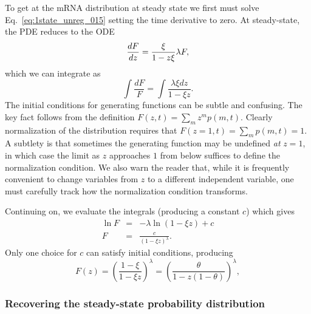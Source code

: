 To get at the mRNA distribution at steady state we first must solve
Eq.~\ref{eq:1state_unreg_015} setting the time derivative to zero. At
steady-state, the PDE reduces to the ODE
\begin{equation}
\deriv[F]{z} = \frac{\xi}{1-z\xi}\lambda F,
\end{equation}
which we can integrate as
\begin{equation}
\int \frac{dF}{F} = \int \frac{\lambda\xi dz}{1-\xi z}.
\end{equation}
The initial conditions for generating functions can be subtle and confusing. The
key fact follows from the definition
$F(z,t) = \sum_m z^m p(m,t)$.
Clearly normalization of the distribution requires that
$F(z=1, t) = \sum_m p(m,t) = 1$.
A subtlety is that sometimes the generating function may be undefined
\textit{at} $z=1$, in which case the limit as $z$ approaches $1$ from
below suffices to define the normalization condition.
We also warn the reader that, while it is frequently convenient to change
variables from $z$ to a different independent variable, one must
carefully track how the normalization condition transforms.

Continuing on, we evaluate the integrals (producing a constant $c$) which gives
\begin{eqnarray}
\ln F &=& -\lambda \ln(1-\xi z) + c
\\
F &=& \frac{c}{(1-\xi z)^\lambda}.
\end{eqnarray}
Only one choice for $c$ can satisfy initial conditions, producing
\begin{equation}
F(z) = \left(\frac{1-\xi}{1-\xi z}\right)^\lambda
        = \left(\frac{\theta}{1 - z(1-\theta)}\right)^\lambda,
\label{eq:gen_fn}
\end{equation}

\subsubsection{Recovering the steady-state probability distribution}

